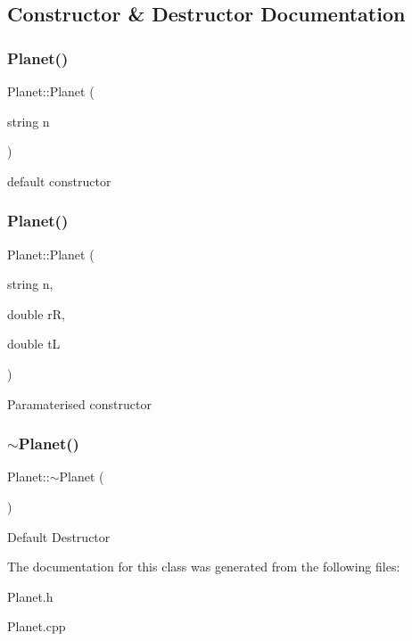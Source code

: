 \subsection{Constructor \& Destructor Documentation}
\mbox{\label{classPlanet_ae98ce54858c1174201987d73228fa29b}} 
\subsubsection{\texorpdfstring{Planet()}{Planet()}\hspace{0.1cm}{\footnotesize\ttfamily [1/2]}}
{\footnotesize\ttfamily Planet\+::\+Planet (\begin{DoxyParamCaption}\item[{string}]{n }\end{DoxyParamCaption})}

default constructor \mbox{\label{classPlanet_afd66d974488511c495e6e5aa2e886085}} 
\subsubsection{\texorpdfstring{Planet()}{Planet()}\hspace{0.1cm}{\footnotesize\ttfamily [2/2]}}
{\footnotesize\ttfamily Planet\+::\+Planet (\begin{DoxyParamCaption}\item[{string}]{n,  }\item[{double}]{rR,  }\item[{double}]{tL }\end{DoxyParamCaption})}

Paramaterised constructor \mbox{\label{classPlanet_aaa1aaed9d4ef90b4836531edb7b18e0a}} 
\subsubsection{\texorpdfstring{$\sim$\+Planet()}{~Planet()}}
{\footnotesize\ttfamily Planet\+::$\sim$\+Planet (\begin{DoxyParamCaption}{ }\end{DoxyParamCaption})}

Default Destructor 

The documentation for this class was generated from the following files\+:\begin{DoxyCompactItemize}
\item 
Planet.\+h\item 
Planet.\+cpp\end{DoxyCompactItemize}
